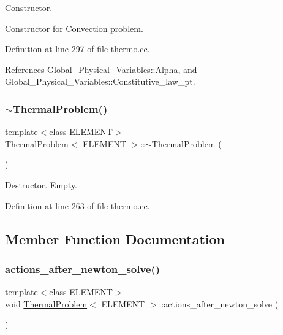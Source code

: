 Constructor. 

Constructor for Convection problem. 

Definition at line 297 of file thermo.\+cc.



References Global\+\_\+\+Physical\+\_\+\+Variables\+::\+Alpha, and Global\+\_\+\+Physical\+\_\+\+Variables\+::\+Constitutive\+\_\+law\+\_\+pt.

\mbox{\label{classThermalProblem_af563f946765bdae233c202738bf7e725}} 
\subsubsection{\texorpdfstring{$\sim$\+Thermal\+Problem()}{~ThermalProblem()}}
{\footnotesize\ttfamily template$<$class E\+L\+E\+M\+E\+NT$>$ \\
\hyperlink{classThermalProblem}{Thermal\+Problem}$<$ E\+L\+E\+M\+E\+NT $>$\+::$\sim$\hyperlink{classThermalProblem}{Thermal\+Problem} (\begin{DoxyParamCaption}{ }\end{DoxyParamCaption})\hspace{0.3cm}{\ttfamily [inline]}}



Destructor. Empty. 



Definition at line 263 of file thermo.\+cc.



\subsection{Member Function Documentation}
\mbox{\label{classThermalProblem_ad38edfd46e049fdbc5b00bafb661f8e2}} 
\subsubsection{\texorpdfstring{actions\+\_\+after\+\_\+newton\+\_\+solve()}{actions\_after\_newton\_solve()}}
{\footnotesize\ttfamily template$<$class E\+L\+E\+M\+E\+NT$>$ \\
void \hyperlink{classThermalProblem}{Thermal\+Problem}$<$ E\+L\+E\+M\+E\+NT $>$\+::actions\+\_\+after\+\_\+newton\+\_\+solve (\begin{DoxyParamCaption}{ }\end{DoxyParamCaption})\hspace{0.3cm}{\ttfamily [inline]}}




